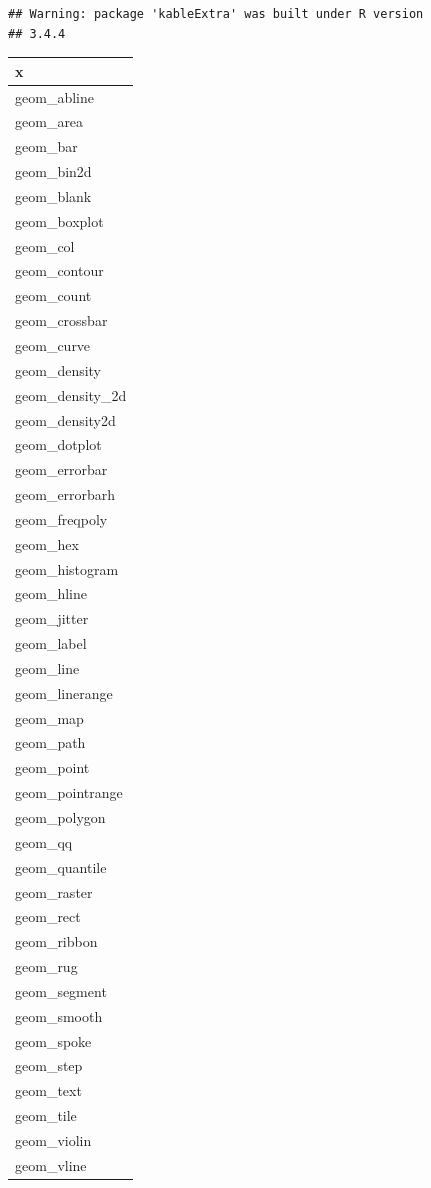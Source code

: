 \documentclass[]{krantz}
\theoremstyle{definition}
\theoremstyle{definition}
\theoremstyle{definition}
\theoremstyle{remark}
\begin{document}
\begin{verbatim}
## Warning: package 'kableExtra' was built under R version
## 3.4.4
\end{verbatim}

\begin{tabular}{l}
\hline
x\\
\hline
geom\_abline\\
\hline
geom\_area\\
\hline
geom\_bar\\
\hline
geom\_bin2d\\
\hline
geom\_blank\\
\hline
geom\_boxplot\\
\hline
geom\_col\\
\hline
geom\_contour\\
\hline
geom\_count\\
\hline
geom\_crossbar\\
\hline
geom\_curve\\
\hline
geom\_density\\
\hline
geom\_density\_2d\\
\hline
geom\_density2d\\
\hline
geom\_dotplot\\
\hline
geom\_errorbar\\
\hline
geom\_errorbarh\\
\hline
geom\_freqpoly\\
\hline
geom\_hex\\
\hline
geom\_histogram\\
\hline
geom\_hline\\
\hline
geom\_jitter\\
\hline
geom\_label\\
\hline
geom\_line\\
\hline
geom\_linerange\\
\hline
geom\_map\\
\hline
geom\_path\\
\hline
geom\_point\\
\hline
geom\_pointrange\\
\hline
geom\_polygon\\
\hline
geom\_qq\\
\hline
geom\_quantile\\
\hline
geom\_raster\\
\hline
geom\_rect\\
\hline
geom\_ribbon\\
\hline
geom\_rug\\
\hline
geom\_segment\\
\hline
geom\_smooth\\
\hline
geom\_spoke\\
\hline
geom\_step\\
\hline
geom\_text\\
\hline
geom\_tile\\
\hline
geom\_violin\\
\hline
geom\_vline\\
\hline
\end{tabular}
\end{document}
